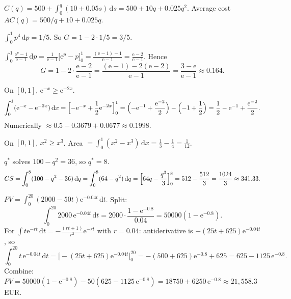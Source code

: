 \begin{solutions}
  \item $\displaystyle C(q)=500+\int_{0}^{q} (10+0.05s)\,\mathrm{d}s
        =500+10q+0.025q^{2}$. Average cost
        $AC(q)=500/q+10+0.025q$.

  \item $\displaystyle\int_{0}^{1} p^{4}\,\mathrm{d}p=1/5$. So
        $G=1-2\cdot 1/5=3/5$.

  \item $\displaystyle\int_{0}^{1} \frac{\mathrm{e}^{p}-1}{\mathrm{e}-1}\,\mathrm{d}p
        =\frac{1}{\mathrm{e}-1}\bigl[\mathrm{e}^{p}-p\bigr]_{0}^{1}
        =\frac{(\mathrm{e}-1)-1}{\mathrm{e}-1}=\frac{\mathrm{e}-2}{\mathrm{e}-1}$.
        Hence
        \[
          G=1-2\cdot\frac{\mathrm{e}-2}{\mathrm{e}-1}
            =\frac{(\mathrm{e}-1)-2(\mathrm{e}-2)}{\mathrm{e}-1}
            =\frac{3-\mathrm{e}}{\mathrm{e}-1}\approx 0.164 .
        \]

  \item On $[0,1]$, $\mathrm{e}^{-x}\ge\mathrm{e}^{-2x}$.
        \[
          \int_{0}^{1} (\mathrm{e}^{-x}-\mathrm{e}^{-2x})\,\mathrm{d}x
            =\Bigl[-\mathrm{e}^{-x}+\frac{1}{2}\mathrm{e}^{-2x}\Bigr]_{0}^{1}
            =\Bigl(-\mathrm{e}^{-1}+\frac{\mathrm{e}^{-2}}{2}\Bigr)
             -\Bigl(-1+\frac{1}{2}\Bigr)
            =\frac{1}{2}-\mathrm{e}^{-1}+\frac{\mathrm{e}^{-2}}{2} .
        \]
        Numerically $\approx 0.5-0.3679+0.0677\approx 0.1998$.

  \item On $[0,1]$, $x^{2}\ge x^{3}$. Area
        $=\displaystyle\int_{0}^{1} (x^{2}-x^{3})\,\mathrm{d}x
        =\frac{1}{3}-\frac{1}{4}=\frac{1}{12}$.

  \item $q^{*}$ solves $100-q^{2}=36$, so $q^{*}=8$.
        \[
          CS=\int_{0}^{8} (100-q^{2}-36)\,\mathrm{d}q
            =\int_{0}^{8}(64-q^{2})\,\mathrm{d}q
            =\Bigl[64q-\frac{q^{3}}{3}\Bigr]_{0}^{8}=512-\frac{512}{3}
            =\frac{1024}{3}\approx 341.33 .
        \]

  \item $PV=\int_{0}^{20} (2000-50t)\mathrm{e}^{-0.04t}\,\mathrm{d}t$.
        Split:
        \[
          \int_{0}^{20} 2000\,\mathrm{e}^{-0.04t}\,\mathrm{d}t
            =2000\cdot\frac{1-\mathrm{e}^{-0.8}}{0.04}=50000(1-\mathrm{e}^{-0.8}) .
        \]
        For $\int t\mathrm{e}^{-rt}\,\mathrm{d}t
        =-\frac{(rt+1)}{r^{2}}\mathrm{e}^{-rt}$ with $r=0.04$:
        antiderivative is $-(25t+625)\mathrm{e}^{-0.04t}$, so
        \[
          \int_{0}^{20} t\,\mathrm{e}^{-0.04t}\,\mathrm{d}t
            =\bigl[-(25t+625)\mathrm{e}^{-0.04t}\bigr]_{0}^{20}
            =-(500+625)\mathrm{e}^{-0.8}+625=625-1125\,\mathrm{e}^{-0.8} .
        \]
        Combine: $PV=50000(1-\mathrm{e}^{-0.8})-50(625-1125\,\mathrm{e}^{-0.8})
        =18750+6250\,\mathrm{e}^{-0.8}\approx 21{,}558.3$ EUR.


\end{solutions}
